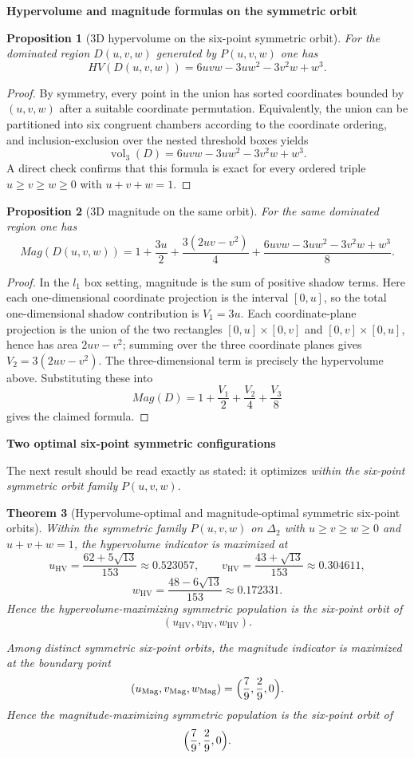 \documentclass{article}
\def\ell{l}%
\def\HV{HV}%
\def\Mag{Mag}%
\newtheorem{theorem}{Theorem}[section]
\newtheorem{proposition}[theorem]{Proposition}
\theoremstyle{definition}
\newcommand{\Mag}{\operatorname{Mag}}
\newcommand{\HV}{\operatorname{HV}}
\newcommand{\1}{\mathbf{1}}
\newcommand{\vol}{\operatorname{vol}}
\newcommand{\myparagraph}[1]{\medskip\noindent\textbf{#1}}
\begin{document}
\myparagraph{Hypervolume and magnitude formulas on the symmetric orbit}

\begin{proposition}[3D hypervolume on the six-point symmetric orbit]
For the dominated region $D(u,v,w)$ generated by $P(u,v,w)$ one has
\[
\HV(D(u,v,w))=6uvw-3uw^2-3v^2w+w^3.
\]
\end{proposition}

\begin{proof}
By symmetry, every point in the union has sorted coordinates bounded by $(u,v,w)$ after a suitable coordinate permutation. Equivalently, the union can be partitioned into six congruent chambers according to the coordinate ordering, and inclusion-exclusion over the nested threshold boxes yields
\[
\vol_3(D)=6uvw-3uw^2-3v^2w+w^3.
\]
A direct check confirms that this formula is exact for every ordered triple $u\ge v\ge w\ge 0$ with $u+v+w=1$.
\end{proof}

\begin{proposition}[3D magnitude on the same orbit]
For the same dominated region one has
\[
\Mag(D(u,v,w))
=
1+\frac{3u}{2}
+\frac{3(2uv-v^2)}{4}
+\frac{6uvw-3uw^2-3v^2w+w^3}{8}.
\]
\end{proposition}

\begin{proof}
In the $\ell_1$ box setting, magnitude is the sum of positive shadow terms. Here each one-dimensional coordinate projection is the interval $[0,u]$, so the total one-dimensional shadow contribution is $V_1=3u$. Each coordinate-plane projection is the union of the two rectangles $[0,u]\times[0,v]$ and $[0,v]\times[0,u]$, hence has area $2uv-v^2$; summing over the three coordinate planes gives $V_2=3(2uv-v^2)$. The three-dimensional term is precisely the hypervolume above. Substituting these into
\[
\Mag(D)=1+\frac{V_1}{2}+\frac{V_2}{4}+\frac{V_3}{8}
\]
gives the claimed formula.
\end{proof}

\myparagraph{Two optimal six-point symmetric configurations}

The next result should be read exactly as stated: it optimizes \emph{within the six-point symmetric orbit family} $P(u,v,w)$.

\begin{theorem}[Hypervolume-optimal and magnitude-optimal symmetric six-point orbits]
Within the symmetric family $P(u,v,w)$ on $\Delta_2$ with $u\ge v\ge w\ge 0$ and $u+v+w=1$, the hypervolume indicator is maximized at
\[
u_{\mathrm{HV}}=\frac{62+5\sqrt{13}}{153}\approx 0.523057,\qquad
v_{\mathrm{HV}}=\frac{43+\sqrt{13}}{153}\approx 0.304611,
\]
\[
w_{\mathrm{HV}}=\frac{48-6\sqrt{13}}{153}\approx 0.172331.
\]
Hence the hypervolume-maximizing symmetric population is the six-point orbit of
\[
(u_{\mathrm{HV}},v_{\mathrm{HV}},w_{\mathrm{HV}}).
\]

Among distinct symmetric six-point orbits, the magnitude indicator is maximized at the boundary point
\[
(u_{\mathrm{Mag}},v_{\mathrm{Mag}},w_{\mathrm{Mag}})
=
\Bigl(\frac79,\frac29,0\Bigr).
\]
Hence the magnitude-maximizing symmetric population is the six-point orbit of
\[
\Bigl(\frac79,\frac29,0\Bigr).
\]
\end{theorem}
\end{document}
